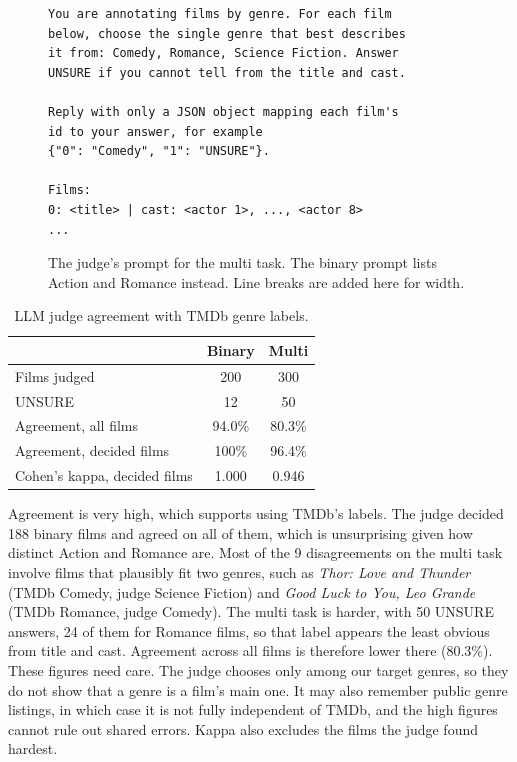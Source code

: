 \documentclass[11pt]{article}
\begin{document}
\begin{figure}[t]
\scriptsize
\begin{verbatim}
You are annotating films by genre. For each film
below, choose the single genre that best describes
it from: Comedy, Romance, Science Fiction. Answer
UNSURE if you cannot tell from the title and cast.

Reply with only a JSON object mapping each film's
id to your answer, for example
{"0": "Comedy", "1": "UNSURE"}.

Films:
0: <title> | cast: <actor 1>, ..., <actor 8>
...
\end{verbatim}
\caption{The judge's prompt for the multi task. The binary prompt lists Action and Romance instead. Line breaks are added here for width.}
\label{fig:prompt}
\end{figure}

\begin{table}[t]
\centering
\small
\begin{tabular}{lcc}
\toprule
 & Binary & Multi \\
\midrule
Films judged & 200 & 300 \\
UNSURE & 12 & 50 \\
Agreement, all films & 94.0\% & 80.3\% \\
Agreement, decided films & 100\% & 96.4\% \\
Cohen's kappa, decided films & 1.000 & 0.946 \\
\bottomrule
\end{tabular}
\caption{LLM judge agreement with TMDb genre labels.}
\label{tab:judge}
\end{table}

Agreement is very high, which supports using TMDb's labels. The judge decided 188 binary films and agreed on all of them, which is unsurprising given how distinct Action and Romance are. Most of the 9 disagreements on the multi task involve films that plausibly fit two genres, such as \textit{Thor: Love and Thunder} (TMDb Comedy, judge Science Fiction) and \textit{Good Luck to You, Leo Grande} (TMDb Romance, judge Comedy). The multi task is harder, with 50 UNSURE answers, 24 of them for Romance films, so that label appears the least obvious from title and cast. Agreement across all films is therefore lower there (80.3\%). These figures need care. The judge chooses only among our target genres, so they do not show that a genre is a film's main one. It may also remember public genre listings, in which case it is not fully independent of TMDb, and the high figures cannot rule out shared errors. Kappa also excludes the films the judge found hardest.
\end{document}
